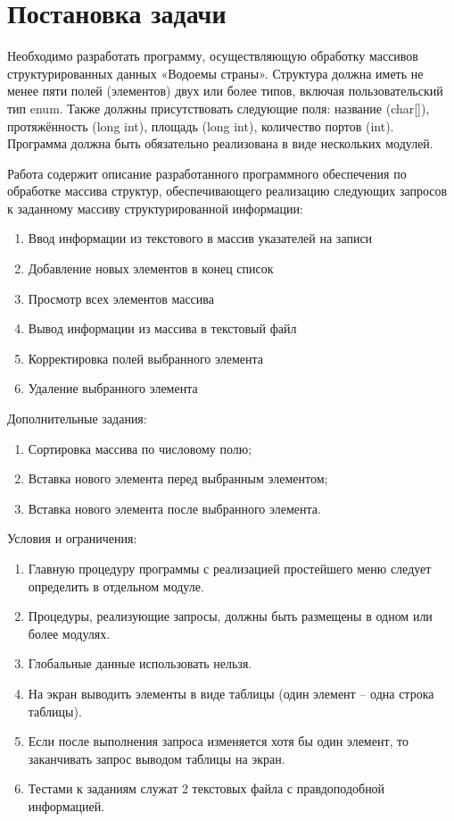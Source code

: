 \newpage

\section{Постановка задачи}

Необходимо разработать программу, осуществляющую обработку массивов структурированных данных «Водоемы страны». Структура должна иметь не менее пяти полей (элементов) двух или более типов, включая пользовательский тип enum. Также должны присутствовать следующие поля: название (char[]), протяжённость (long int), площадь (long int), количество портов (int). Программа должна быть обязательно реализована в виде нескольких модулей.

Работа содержит описание разработанного программного обеспечения по обработке массива структур, обеспечивающего реализацию следующих запросов к заданному массиву структурированной информации: 

\begin{enumerate}
    \item Ввод информации из текстового в массив указателей на записи
    \item Добавление новых элементов в конец список
    \item Просмотр всех элементов массива
    \item Вывод информации из массива в текстовый файл
    \item Корректировка полей выбранного элемента
    \item Удаление выбранного элемента
\end{enumerate}

Дополнительные задания:

\begin{enumerate}
    \item Сортировка массива по числовому полю;
    \item Вставка нового элемента перед выбранным элементом;
    \item Вставка нового элемента после выбранного элемента.
\end{enumerate}

Условия и ограничения:

\begin{enumerate}
    \item Главную процедуру программы с реализацией простейшего меню следует определить в отдельном модуле.
    \item Процедуры, реализующие запросы, должны быть размещены в одном или более модулях.
    \item Глобальные данные использовать нельзя.
    \item На экран выводить элементы в виде таблицы (один элемент – одна строка таблицы).
    \item Если после выполнения запроса изменяется хотя бы один элемент, то заканчивать запрос выводом таблицы на экран.
    \item Тестами к заданиям служат 2 текстовых файла с правдоподобной информацией.
\end{enumerate}

\newpage